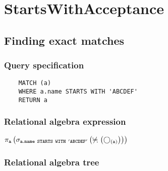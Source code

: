 
	\section{StartsWithAcceptance}

	\subsection{Finding exact matches}

	\subsubsection*{Query specification}

	\begin{lstlisting}
	MATCH (a)
	WHERE a.name STARTS WITH 'ABCDEF'
	RETURN a
	\end{lstlisting}


	\subsubsection*{Relational algebra expression}

	$\projection{\var{a}} \left(\selection{\mathtt{a.name~STARTS~WITH~'ABCDEF'}} \left(\alldifferent{} \left(\getvertices{a}{}\right)\right)\right)$

	\subsubsection*{Relational algebra tree}



